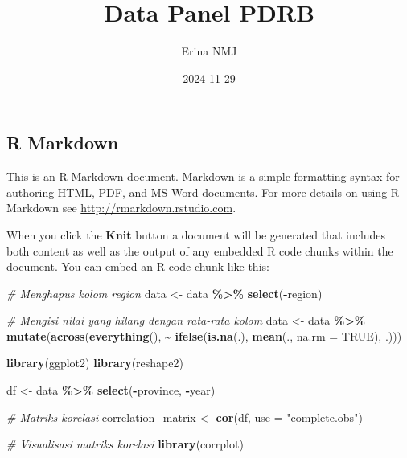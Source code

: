 \documentclass[
]{article}
\title{Data Panel PDRB}
\author{Erina NMJ}
\date{2024-11-29}
\newenvironment{Shaded}{\begin{snugshade}}{\end{snugshade}}
\newcommand{\AttributeTok}[1]{\textcolor[rgb]{0.13,0.29,0.53}{#1}}
\newcommand{\CommentTok}[1]{\textcolor[rgb]{0.56,0.35,0.01}{\textit{#1}}}
\newcommand{\ConstantTok}[1]{\textcolor[rgb]{0.56,0.35,0.01}{#1}}
\newcommand{\FunctionTok}[1]{\textcolor[rgb]{0.13,0.29,0.53}{\textbf{#1}}}
\newcommand{\NormalTok}[1]{#1}
\newcommand{\OtherTok}[1]{\textcolor[rgb]{0.56,0.35,0.01}{#1}}
\newcommand{\SpecialCharTok}[1]{\textcolor[rgb]{0.81,0.36,0.00}{\textbf{#1}}}
\newcommand{\StringTok}[1]{\textcolor[rgb]{0.31,0.60,0.02}{#1}}
\begin{document}
\maketitle

\subsection{R Markdown}\label{r-markdown}

This is an R Markdown document. Markdown is a simple formatting syntax
for authoring HTML, PDF, and MS Word documents. For more details on
using R Markdown see \url{http://rmarkdown.rstudio.com}.

When you click the \textbf{Knit} button a document will be generated
that includes both content as well as the output of any embedded R code
chunks within the document. You can embed an R code chunk like this:

\begin{Shaded}
\begin{Highlighting}[]
\CommentTok{\# Menghapus kolom \textquotesingle{}region\textquotesingle{}}
\NormalTok{data }\OtherTok{\textless{}{-}}\NormalTok{ data }\SpecialCharTok{\%\textgreater{}\%} \FunctionTok{select}\NormalTok{(}\SpecialCharTok{{-}}\NormalTok{region)}

\CommentTok{\# Mengisi nilai yang hilang dengan rata{-}rata kolom}
\NormalTok{data }\OtherTok{\textless{}{-}}\NormalTok{ data }\SpecialCharTok{\%\textgreater{}\%} \FunctionTok{mutate}\NormalTok{(}\FunctionTok{across}\NormalTok{(}\FunctionTok{everything}\NormalTok{(), }\SpecialCharTok{\textasciitilde{}} \FunctionTok{ifelse}\NormalTok{(}\FunctionTok{is.na}\NormalTok{(.), }\FunctionTok{mean}\NormalTok{(., }\AttributeTok{na.rm =} \ConstantTok{TRUE}\NormalTok{), .)))}
\end{Highlighting}
\end{Shaded}

\begin{Shaded}
\begin{Highlighting}[]
\FunctionTok{library}\NormalTok{(ggplot2)}
\FunctionTok{library}\NormalTok{(reshape2)}

\NormalTok{df }\OtherTok{\textless{}{-}}\NormalTok{ data }\SpecialCharTok{\%\textgreater{}\%} \FunctionTok{select}\NormalTok{(}\SpecialCharTok{{-}}\NormalTok{province, }\SpecialCharTok{{-}}\NormalTok{year)}

\CommentTok{\# Matriks korelasi}
\NormalTok{correlation\_matrix }\OtherTok{\textless{}{-}} \FunctionTok{cor}\NormalTok{(df, }\AttributeTok{use =} \StringTok{"complete.obs"}\NormalTok{)}

\CommentTok{\# Visualisasi matriks korelasi}
\FunctionTok{library}\NormalTok{(corrplot)}
\end{Highlighting}
\end{Shaded}
\end{document}
